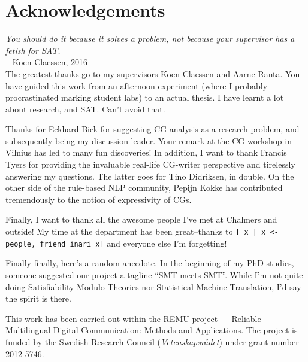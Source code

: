 \chapter*{Acknowledgements}\label{chp:acknowledgements}


\emph{You should do it because it solves a problem, not because your supervisor has a fetish for SAT.} \\
-- Koen Claessen, 2016 \\

The greatest thanks go to my supervisors Koen Claessen and Aarne Ranta. 
You have guided this work from an afternoon experiment (where I probably procrastinated marking student labs) to an actual thesis. I have learnt a lot about research,  and SAT. Can't avoid that.


Thanks for Eckhard Bick for suggesting CG analysis as a research
problem, and subsequently being my discussion leader. 
Your remark at the CG workshop in Vilnius has led to many fun discoveries!
In addition, I want to thank Francis Tyers for providing the invaluable real-life CG-writer perspective and tirelessly answering my questions. The latter goes for Tino Didriksen, in double. On the other side of the rule-based NLP community, Pepijn Kokke 
has contributed tremendously to the notion of expressivity of CGs.

Finally, I want to thank all the awesome people I've met at Chalmers and outside! 
My time at the department has been great--thanks to 
\texttt{[ x | x <- people, friend inari x]}  and everyone else I'm forgetting! 









Finally finally, here's a random anecdote. 
In the beginning of my PhD studies, someone suggested our project 
a tagline ``SMT meets SMT''. While I'm not quite doing Satisfiability
Modulo Theories nor Statistical Machine Translation, I'd say the spirit is there.






\vfill\noindent
This work has been carried out within the REMU project — Reliable Multilingual Digital Communication: Methods and Applications.
The project is funded by the Swedish Research Council (\emph{Vetenskapsrådet}) under grant number 2012-5746.
